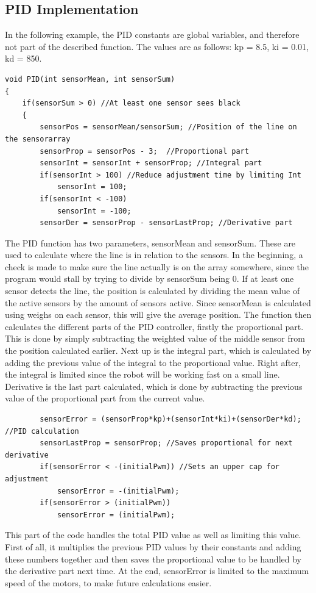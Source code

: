 \subsection{PID Implementation}
In the following example, the PID constants are global variables, and therefore not part of the described function. The values are as follows: kp = 8.5, ki = 0.01, kd = 850.
\begin{lstlisting}
void PID(int sensorMean, int sensorSum)
{
	if(sensorSum > 0) //At least one sensor sees black
	{
		sensorPos = sensorMean/sensorSum; //Position of the line on the sensorarray
		sensorProp = sensorPos - 3;  //Proportional part
		sensorInt = sensorInt + sensorProp; //Integral part
		if(sensorInt > 100) //Reduce adjustment time by limiting Int
			sensorInt = 100;  
		if(sensorInt < -100)
			sensorInt = -100;
		sensorDer = sensorProp - sensorLastProp; //Derivative part
\end{lstlisting}

The PID function has two parameters, sensorMean and sensorSum. These are used to calculate where the line is in relation to the sensors. In the beginning, a check is made to make sure the line actually is on the array somewhere, since the program would stall by trying to divide by sensorSum being 0. If at least one sensor detects the line, the position is calculated by dividing the mean value of the active sensors by the amount of sensors active. Since sensorMean is calculated using weighs on each sensor, this will give the average position. The function then calculates the different parts of the PID controller, firstly the proportional part. This is done by simply subtracting the weighted value of the middle sensor from the position calculated earlier. Next up is the integral part, which is calculated by adding the previous value of the integral to the proportional value. Right after, the integral is limited since the robot will be working fast on a small line. Derivative is the last part calculated, which is done by subtracting the previous value of the proportional part from the current value.

\begin{lstlisting}
		sensorError = (sensorProp*kp)+(sensorInt*ki)+(sensorDer*kd); //PID calculation
		sensorLastProp = sensorProp; //Saves proportional for next derivative
		if(sensorError < -(initialPwm)) //Sets an upper cap for adjustment
			sensorError = -(initialPwm);
		if(sensorError > (initialPwm))
			sensorError = (initialPwm);
\end{lstlisting}
This part of the code handles the total PID value as well as limiting this value. First of all, it multiplies the previous PID values by their constants and adding these numbers together and then saves the proportional value to be handled by the derivative part next time. At the end, sensorError is limited to the maximum speed of the motors, to make future calculations easier.

